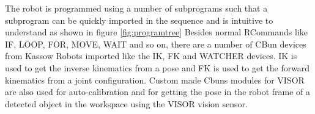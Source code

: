 The robot is programmed using a number of subprograms such that a subprogram
can be quickly imported in the sequence and is intuitive to understand as shown in figure \ref{fig:programtree}
Besides normal RCommands like IF, LOOP, FOR, MOVE, WAIT and so on, there are a number of CBun devices
from Kassow Robots
imported like the IK, FK and WATCHER devices. IK is used to get the inverse
kinematics from a pose and FK is used to get the forward kinematics
from a joint configuration.
Custom made Cbuns modules for VISOR
are also used for auto-calibration and for getting the pose in the
robot frame of a detected object in the workspace using the VISOR vision sensor.

